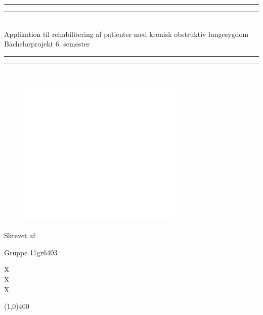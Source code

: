 \begin{center}
\vspace*{\baselineskip}
\rule{\textwidth}{1.6pt}\vspace*{-\baselineskip}\vspace*{2pt} %
\rule{\textwidth}{0.4pt}\\[\baselineskip] %

{\huge Applikation til rehabilitering af  patienter med kronisk obstruktiv lungesygdom\\[0.4\baselineskip] \LARGE Bachelorprojekt 6. semester}\\[0.2\baselineskip] %

\rule{\textwidth}{0.4pt}\vspace*{-\baselineskip}\vspace{3.2pt} %
\rule{\textwidth}{1.6pt}\\[\baselineskip] %
\vspace*{3\baselineskip}



\begin{figure}[H]
	\centering
	\begin{minipage}[b]{1\textwidth}	\includegraphics[width=0.7\textwidth]{figures/Forside}
	\end{minipage}
	\hfill
\end{figure}
Skrevet af \\
{\Large Gruppe 17gr6403\par}
\end{center} %
{\color{white}X \\ X \\ X \\}

%	
\begin{center}
\line(1,0){400}
\end{center}

